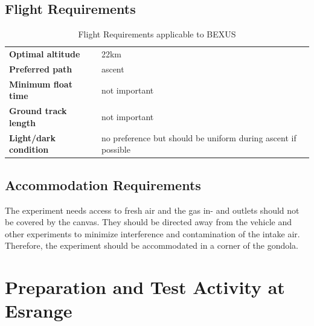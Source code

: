 \subsection{Flight Requirements}
\begin{table}[htbp]
\centering
\caption{Flight Requirements applicable to BEXUS}
\label{tab:flight_req_bexus}
\begin{tabular}{p{5cm} p{10cm}}
\toprule
\textbf{Optimal altitude} & 22km \\
\textbf{Preferred path} & ascent \\
\textbf{Minimum float time} & not important\\
\textbf{Ground track length} & not important\\
\textbf{Light/dark condition} & no preference but should be uniform during ascent if possible\\
\bottomrule
\end{tabular}
\end{table}

\subsection{Accommodation Requirements}

The experiment needs access to fresh air and the gas in- and outlets should not be covered by the canvas. They should be directed away from the vehicle and other experiments to minimize interference and contamination of the intake air. Therefore, the experiment should be accommodated in a corner of the gondola.
\clearpage

\section{Preparation and Test Activity at Esrange}
\label{sec:ESRANGE_activity}

